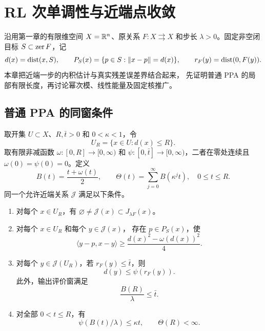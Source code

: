 \section{RL 次单调性与近端点收敛}
\label{sec:rleb-ppa}

沿用第一章的有限维空间 $X=\mathbb R^n$、原关系 $F:X\rightrightarrows X$
和步长 $\lambda>0$。固定非空闭目标 $S\subset\operatorname{zer} F$，记
\[
 d(x)=\operatorname{dist}(x,S),\qquad
 P_S(x)=\{p\in S:\|x-p\|=d(x)\},\qquad
 r_F(y)=\operatorname{dist}(0,F(y)).
\]
本章把近端一步的内积估计与真实残差误差界结合起来，
先证明普通 PPA 的局部有限长度，再讨论幂次模、线性能量及固定核推广。

\subsection{普通 PPA 的同窗条件}

\begin{assumption}
\label{ass:rleb-ppa}
取开集 $U\subset X$、$R,\bar t>0$ 和 $0<\kappa<1$，令
\[
 U_R=\{x\in U:d(x)\le R\}.
\]
取有限非减函数 $\omega:[0,R]\to[0,\infty)$ 和
$\psi:[0,\bar t]\to[0,\infty)$，二者在零处连续且
$\omega(0)=\psi(0)=0$。定义
\begin{equation}
\label{eq:ppa-length-modulus}
 B(t)=\frac{t+\omega(t)}2,\qquad
 \Theta(t)=\sum_{j=0}^{\infty}B(\kappa^jt),\quad 0\le t\le R.
\end{equation}
同一个允许近端关系 $\mathcal J$ 满足以下条件。
\begin{enumerate}
\item[(P1)] 对每个 $x\in U_R$，有
$\varnothing\ne\mathcal J(x)\subset J_{\lambda F}(x)$。
\item[(P2)] 对每个 $x\in U_R$ 和每个 $y\in\mathcal J(x)$，
存在 $p\in P_S(x)$，使
\begin{equation}
\label{eq:ppa-zero-anchor}
 \langle y-p,x-y\rangle
 \ge\frac{d(x)^2-\omega(d(x))^2}{4}.
\end{equation}
\item[(P3)] 对每个 $y\in\mathcal J(U_R)$，若 $r_F(y)\le\bar t$，则
\begin{equation}
\label{eq:ppa-true-output-EB}
 d(y)\le\psi(r_F(y)).
\end{equation}
此外，输出评价窗满足
\begin{equation}
\label{eq:ppa-output-window}
 \frac{B(R)}\lambda\le\bar t.
\end{equation}
\item[(P4)] 对全部 $0<t\le R$，有
\begin{equation}
\label{eq:direct-compatibility}
 \psi(B(t)/\lambda)\le\kappa t,
 \qquad \Theta(R)<\infty.
\end{equation}
\end{enumerate}
\end{assumption}

